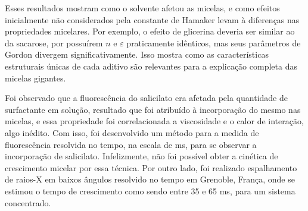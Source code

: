 \documentclass[
	12pt,				%
	oneside,
	a4paper,			%
	english,			%
	brazil%
	]{abntex2}
\begin{document}
\begin{resumo}
	Esses resultados mostram como o solvente afetou as micelas, e como efeitos inicialmente não considerados pela constante de Hamaker levam à diferenças nas propriedades micelares. Por exemplo, o efeito de glicerina deveria ser similar ao da sacarose, por possuírem \(n\) e \(\varepsilon\) praticamente idênticos, mas seus parâmetros de Gordon divergem significativamente. Isso mostra como as características estruturais únicas de cada aditivo são relevantes para a explicação completa das micelas gigantes.
	
	Foi observado que a fluorescência do salicilato era afetada pela quantidade de surfactante em solução, resultado que foi atribuído à incorporação do mesmo nas micelas, e essa propriedade foi correlacionada a viscosidade e o calor de interação, algo inédito. Com isso, foi desenvolvido um método para a medida de fluorescência resolvida no tempo, na escala de ms, para se observar a incorporação de salicilato. Infelizmente, não foi possível obter a cinética de crescimento micelar por essa técnica. Por outro lado, foi realizado espalhamento de raios-X em baixos ângulos resolvido no tempo em Grenoble, França, onde se estimou o tempo de crescimento como sendo entre 35 e 65 ms, para um sistema concentrado.
	
	
\end{resumo}
\end{document}
